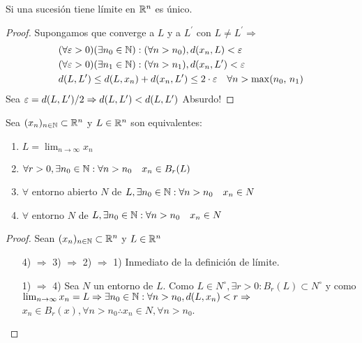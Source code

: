 \begin{lemma}
  Si una sucesión tiene límite en \(\mathbb{R}^n\) es único.
  \begin{proof}
    Supongamos que converge a \(L\) y a \(L^{\prime}\) con \(L \neq L^{\prime} \Rightarrow\) \begin{align*}
       & (\forall \varepsilon > 0)(\exists n_0 \in \mathbb{N}) : (\forall n > n_0), d(x_n, L) < \varepsilon                                      \\
       & (\forall \varepsilon > 0)(\exists n_1 \in \mathbb{N}) : (\forall n > n_1), d(x_n, L^{\prime}) < \varepsilon                             \\
       & d(L, L^{\prime}) \leq d(L, x_n) + d(x_n, L^{\prime}) \leq 2 \cdot \varepsilon \quad \forall n > \max(n_0\text{, } n_1)
    \end{align*}
    Sea \(\varepsilon = d(L, L^{\prime})/2 \Rightarrow d(L, L^{\prime}) < d(L, L^{\prime})\) Absurdo!
  \end{proof}
\end{lemma}

\begin{prop}
  Sea \((x_n)_{n \in \mathbb{N}} \subset \mathbb{R}^n\) y \(L \in \mathbb{R}^n\) son equivalentes:

  \begin{enumerate}
    \item \(L = \lim_{n \to \infty} x_n\)
    \item \(\forall r > 0, \exists n_0 \in \mathbb{N} : \forall n > n_0 \quad x_n \in B_r(L)\)
    \item \(\forall\) entorno abierto \(N\) de \(L, \exists n_0 \in \mathbb{N} : \forall n > n_0 \quad x_n \in N\)
    \item \(\forall\) entorno \(N\) de \(L, \exists n_0 \in \mathbb{N} : \forall n > n_0 \quad x_n \in N\)
  \end{enumerate}
  \begin{proof}
    Sean \((x_n)_{n \in \mathbb{N}} \subset \mathbb{R}^n\) y \(L \in \mathbb{R}^n\) \begin{enumerate}
      \item[4) \(\Rightarrow\) 3) \(\Rightarrow\) 2) \(\Rightarrow\) 1)] Inmediato de la definición de límite.
      \item [1) \(\Rightarrow\) 4)] Sea \(N\) un entorno de \(L\). Como \(L \in N^{\circ}, \exists r > 0 : B_r(L) \subset N^{\circ}\) y como \(\lim_{n \to \infty} x_n = L \Rightarrow \exists n_0 \in \mathbb{N} : \forall n > n_0, d(L, x_n) < r \Rightarrow\) \\
            \(x_n \in B_r(x), \forall n > n_0 \therefore x_n \in N, \forall n > n_0\).
    \end{enumerate}
  \end{proof}
\end{prop}

